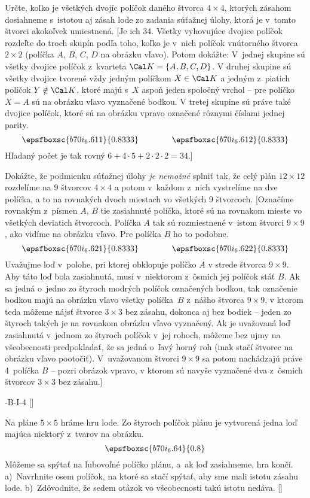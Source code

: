 {Určte, koľko je všetkých dvojíc políčok daného štvorca $4\times4$,
ktorých zásahom dosiahneme s~istotou aj zásah lode zo zadania súťažnej
úlohy, ktorá je v~tomto štvorci akokoľvek umiestnená.
[Je ich 34. Všetky vyhovujúce dvojice políčok rozdeľte do troch skupín
podľa toho, koľko je v~nich políčok vnútorného štvorca $2\times 2$ (políčka
$A$, $B$, $C$, $D$ na obrázku vľavo). Potom dokážte: V~jednej skupine sú
všetky dvojice políčok z~kvarteta ${\Cal K}=\{A,B,C,D\}$.
V druhej skupine sú všetky dvojice tvorené vždy jedným políčkom
$X\in\Cal K$ a jedným z~piatich políčok $Y\notin\Cal K$, ktoré majú
s~$X$ aspoň jeden spoločný vrchol -- pre políčko $X=A$ sú
na obrázku vľavo vyznačené bodkou. V tretej skupine sú práve také
dvojice políčok, ktoré sú na obrázku vpravo označené
rôznymi číslami jednej parity.
$$
\epsfboxsc{b70i_6.611}{0.8333}\qquad\qquad\epsfboxsc{b70i_6.612}{0.8333}
$$
Hľadaný počet je tak rovný $6+4\cdot5+2\cdot2\cdot2=34$.]

Dokážte, že podmienku súťažnej úlohy
{\it je nemožné\/} splniť tak, že celý plán $12\times12$ rozdelíme na 9
štvorcov $4\times4$ a potom v~každom z~nich vystrelíme na
dve políčka, a to na rovnakých dvoch miestach vo všetkých 9 štvorcoch.
[Označíme rovnakým z~písmen $A$, $B$ tie zasiahnuté políčka, ktoré
sú na rovnakom mieste vo všetkých deviatich štvorcoch. Políčka $A$ tak
sú rozmiestnené v~istom štvorci $9\times9$, ako vidíme na
obrázku vľavo. Pre políčka $B$ ho to podobne.
$$
\epsfboxsc{b70i_6.621}{0.8333}\qquad\qquad\epsfboxsc{b70i_6.622}{0.8333}
$$
Uvažujme loď v~polohe, pri ktorej obklopuje políčko $A$ v strede
štvorca $9\times9$. Aby táto loď bola zasiahnutá, musí v~niektorom z~ôsmich
jej políčok stáť $B$.
Ak sa jedná o~jedno zo štyroch modrých políčok označených bodkou, tak označenie bodkou majú na obrázku vľavo všetky políčka~$B$ z~nášho štvorca $9\times9$, v ktorom teda môžeme nájsť štvorce $3\times3$ bez zásahu, dokonca aj bez bodiek
-- jeden zo štyroch takých je na rovnakom obrázku vľavo vyznačený.
Ak je uvažovaná loď zasiahnutá v~jednom zo štyroch
políčok v~jej rohoch, môžeme bez ujmy na všeobecnosti
predpokladať, že sa jedná o~ľavý horný roh (inak stačí štvorec na
obrázku vľavo pootočiť). V~uvažovanom štvorci $9\times9$ sa potom
nachádzajú práve 4~políčka $B$ -- pozri obrázok vpravo, v ktorom
sú navyše vyznačené dva z~ôsmich štvorcov $3\times3$ bez zásahu.]

-B-I-4
[]

Na pláne $5\times 5$ hráme hru lode. Zo štyroch políčok plánu je vytvorená
jedna loď majúca niektorý z~tvarov na obrázku.
$$\epsfboxsc{b70i_6.64}{0.8}$$
Môžeme sa spýtať na ľubovoľné políčko plánu, a~ak loď
zasiahneme, hra končí.
a)~Navrhnite osem políčok, na ktoré sa stačí spýtať, aby sme mali istotu zásahu lode. b)~Zdôvodnite, že sedem otázok vo všeobecnosti takú istotu nedáva.
[]
}

